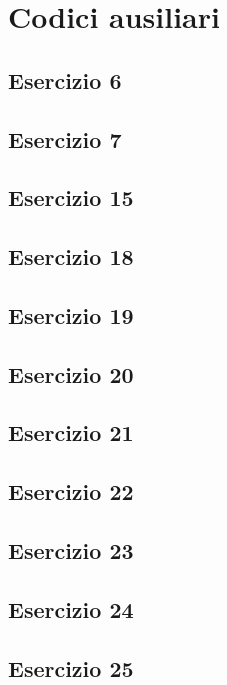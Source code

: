 \section{Codici ausiliari}

\subsection{Esercizio 6}


\subsection{Esercizio 7}


\subsection{Esercizio 15}


\subsection{Esercizio 18}


\subsection{Esercizio 19}


\subsection{Esercizio 20}


\subsection{Esercizio 21}


\subsection{Esercizio 22}


\subsection{Esercizio 23}


\subsection{Esercizio 24}


\subsection{Esercizio 25}

